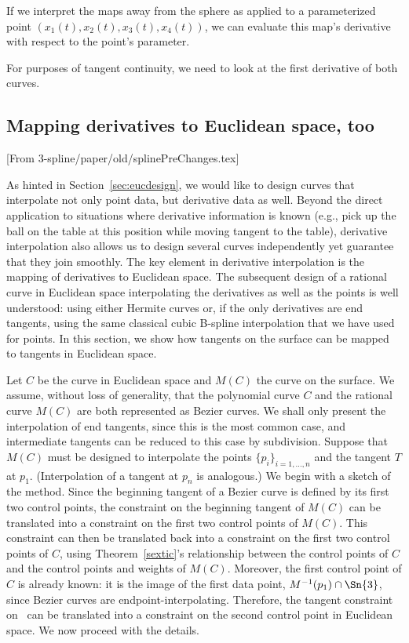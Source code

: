 \documentclass[12pt]{article}
\begin{document}
If we interpret the maps away from the sphere as applied to a parameterized point
$(x_1(t),x_2(t),x_3(t),x_4(t))$, we can evaluate this map's derivative with respect
to the point's parameter.

For purposes of tangent continuity, 
we need to look at the first derivative of both curves.

\subsection{Mapping derivatives to Euclidean space, too}
\label{sec:derivative}

[From 3-spline/paper/old/splinePreChanges.tex]

As hinted in Section~\ref{sec:eucdesign}, 
we would like to design curves that interpolate not only point data,
but derivative data as well.
Beyond the direct application to situations where derivative information
is known (e.g., pick up the ball on the table at this position while
moving tangent to the table), 
derivative interpolation also allows us to design several curves 
independently yet guarantee that they join smoothly.
The key element in derivative interpolation is the mapping of derivatives
to Euclidean space.
The subsequent design of a rational curve in Euclidean space
interpolating the derivatives as well as the points
is well understood: using either Hermite curves or, if the only derivatives
are end tangents, using the same classical cubic B-spline interpolation that
we have used for points.
In this section, we show how tangents on the surface can be mapped
to tangents in Euclidean space.

Let $C$ be the curve in Euclidean space and $M(C)$ the curve on the surface.
We assume, without loss of generality, that the polynomial curve $C$
and the rational curve $M(C)$ are both represented as Bezier curves.
We shall only present the interpolation of end tangents,
since this is the most common case, and intermediate tangents can be
reduced to this case by subdivision.
Suppose that $M(C)$ must be designed to interpolate the points 
$\{p_i\}_{i=1,\ldots,n}$ and the tangent $T$ at $p_1$.
(Interpolation of a tangent at $p_n$ is analogous.)
We begin with a sketch of the method.
Since the beginning tangent of a Bezier curve is defined by its first 
two control points, the constraint on the beginning tangent of $M(C)$ can be
translated into a constraint on the first two control points of $M(C)$.
This constraint can then be translated back into a constraint
on the first two control points of $C$, using Theorem~\ref{sextic}'s
relationship between the control points of $C$ 
and the control points and weights of $M(C)$.
Moreover, the first control point of $C$ is already known:
it is the image of the first data point, $M^{-1}(p_1) \cap \Sn{3}$,
since Bezier curves are endpoint-interpolating.
Therefore, the tangent constraint on \ can be translated
into a constraint on the second control point in Euclidean space.
We now proceed with the details.
\end{document}
